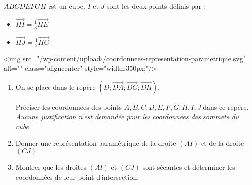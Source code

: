 
%
$ABCDEFGH$ est un cube. $I$ et $J$ sont les deux points définis par :
\begin{itemize}
     \item
     $\overrightarrow{HI}=\frac{1}{3}\overrightarrow{HE}$
     \item
     $\overrightarrow{HJ}=\frac{1}{3}\overrightarrow{HG}$
\end{itemize}
<img src="/wp-content/uploads/coordonnees-representation-parametrique.svg" alt="" class="aligncenter" style="width:350px;"/>
\begin{enumerate}
     \item
     On se place dans le repère $\left(D; \overrightarrow{DA}; \overrightarrow{DC}; \overrightarrow{DH}\right)$.
     \par
     Préciser les coordonnées des points $A, B, C, D, E, F, G, H, I, J$ dans ce repère.
     \textit{Aucune justification n'est demandée pour les coordonnées des sommets du cube.}
     \item
     Donner une représentation paramétrique de la droite $\left(AI\right)$ et de la droite $\left(CJ\right)$
     \item
     Montrer que les droites $\left(AI\right)$ et $\left(CJ\right)$ sont sécantes et déterminer les coordonnées de leur point d'intersection.
\end{enumerate}
